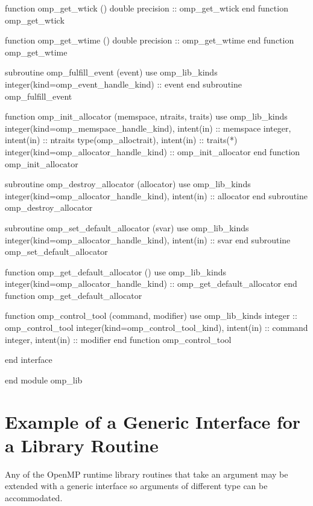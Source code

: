 {\begin{ompfFunction}
    function omp_get_wtick ()
      double precision :: omp_get_wtick
    end function omp_get_wtick

    function omp_get_wtime ()
      double precision :: omp_get_wtime
    end function omp_get_wtime

    subroutine omp_fulfill_event (event)
      use omp_lib_kinds
      integer(kind=omp_event_handle_kind) :: event
    end subroutine omp_fulfill_event

    function omp_init_allocator (memspace, ntraits, traits)
      use omp_lib_kinds
      integer(kind=omp_memspace_handle_kind), intent(in) :: memspace
      integer, intent(in) :: ntraits
      type(omp_alloctrait), intent(in) :: traits(*)
      integer(kind=omp_allocator_handle_kind) :: omp_init_allocator
    end function omp_init_allocator

    subroutine omp_destroy_allocator (allocator)
      use omp_lib_kinds
      integer(kind=omp_allocator_handle_kind), intent(in) :: allocator
    end subroutine omp_destroy_allocator

    subroutine omp_set_default_allocator (svar)
      use omp_lib_kinds
      integer(kind=omp_allocator_handle_kind), intent(in) :: svar
    end subroutine omp_set_default_allocator

    function omp_get_default_allocator ()
      use omp_lib_kinds
      integer(kind=omp_allocator_handle_kind) :: omp_get_default_allocator
    end function omp_get_default_allocator

    function omp_control_tool (command, modifier)
      use omp_lib_kinds
      integer :: omp_control_tool
      integer(kind=omp_control_tool_kind), intent(in) :: command
      integer, intent(in) :: modifier
    end function omp_control_tool

  end interface

end module omp_lib
\end{ompfFunction}} %






\section{Example of a Generic Interface for a Library Routine}
\label{sec:Example of a Generic Interface for a Library Routine}
Any of the OpenMP runtime library routines that take an argument may be extended
with a generic interface so arguments of different  type can be accommodated.

